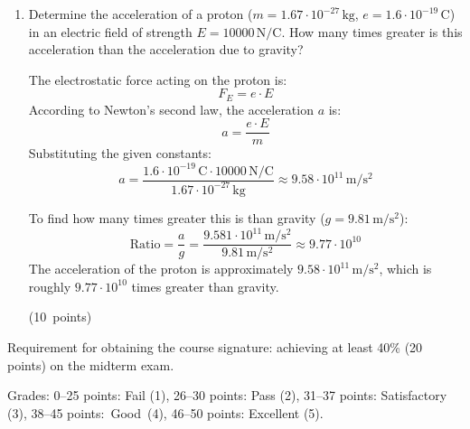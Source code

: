 \documentclass[12pt]{letter}
\begin{document}
\begin{enumerate}
\hfill (10~points)


\bigskip
\item Determine the acceleration of a proton ($m = 1.67 \cdot 10^{-27}\,\mathrm{kg}$, $e=1.6\cdot 10^{-19}\,\mathrm{C}$) in an electric field of strength $ E = 10000\,\mathrm{N/C}. $ How many times greater is this acceleration than the acceleration due to gravity?


\begin{center}
\end{center}

The electrostatic force acting on the proton is:
$$F_E = e \cdot E$$
According to Newton's second law, the acceleration $a$ is:
$$a = \frac{e \cdot E}{m}$$
Substituting the given constants:
$$a = \frac{1.6 \cdot 10^{-19}\,\mathrm{C} \cdot 10000\,\mathrm{N/C}}{1.67 \cdot 10^{-27}\,\mathrm{kg}} \approx 9.58 \cdot 10^{11}\,\mathrm{m/s^2}$$

To find how many times greater this is than gravity ($g = 9.81\,\mathrm{m/s^2}$):
$$\text{Ratio} = \frac{a}{g} = \frac{9.581 \cdot 10^{11}\,\mathrm{m/s^2}}{9.81\,\mathrm{m/s^2}} \approx 9.77 \cdot 10^{10}$$
The acceleration of the proton is approximately $9.58 \cdot 10^{11}\,\mathrm{m/s^2}$, which is roughly $9.77 \cdot 10^{10}$ times greater than gravity.

\hfill (10~points)

\end{enumerate}


Requirement for obtaining the course signature: achieving at least 40\% (20\,points) on the midterm exam.

Grades: 0--25 points: Fail (1), 26--30 points: Pass (2), 31--37 points: Satisfactory (3), 38--45 points:~Good~(4), 46--50 points: Excellent (5).


\vfill
\end{document}
